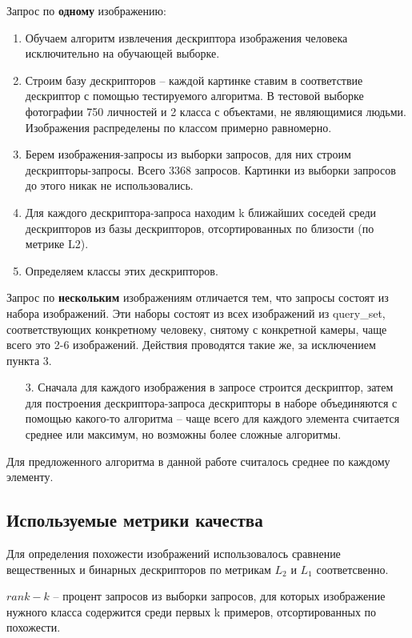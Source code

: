 \documentclass[a4paper]{article}
\begin{document}
\begin{multicols*}{2}
Запрос по \textbf{одному} изображению:

\begin{enumerate}
    \item Обучаем алгоритм извлечения дескриптора изображения человека исключительно на обучающей выборке.
    \item Строим базу дескрипторов -- каждой картинке ставим в соответствие дескриптор с помощью тестируемого алгоритма. В тестовой выборке фотографии 750 личностей и 2 класса с объектами, не являющимися людьми. Изображения распределены по классом примерно равномерно.
    \item Берем изображения-запросы из выборки запросов, для них строим дескрипторы-запросы. Всего 3368 запросов. Картинки из выборки запросов до этого никак не использовались.
    \item Для каждого дескриптора-запроса находим k ближайших соседей среди дескрипторов из базы дескрипторов, отсортированных по близости (по метрике L2).
    \item Определяем классы этих дескрипторов.
\end{enumerate}

Запрос по \textbf{нескольким} изображениям отличается тем, что запросы состоят из набора изображений. Эти наборы состоят из всех изображений из query\_set, соответствующих конкретному человеку, снятому с конкретной камеры, чаще всего это 2-6 изображений. Действия проводятся такие же, за исключением пункта 3.

\begin{enumerate}
    \item[3.] Сначала для каждого изображения в запросе строится дескриптор, затем для построения дескриптора-запроса дескрипторы в наборе объединяются с помощью какого-то алгоритма -- чаще всего для каждого элемента считается среднее или максимум, но возможны более сложные алгоритмы.
\end{enumerate}

Для предложенного алгоритма в данной работе считалось среднее по каждому элементу.

\subsection{Используемые метрики качества}

Для определения похожести изображений использовалось сравнение вещественных и бинарных дескрипторов по метрикам $L_2$ и $L_1$ соответсвенно.

$rank-k$ -- процент запросов из выборки запросов, для которых изображение нужного класса содержится среди первых k примеров, отсортированных по похожести. 


\end{multicols*}
\end{document}
